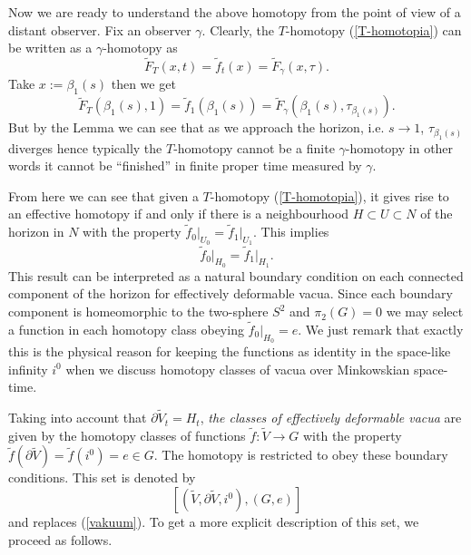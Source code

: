 \documentclass[a4paper,12pt,draft]{article}
\begin{document}
\noindent Now we are ready to understand the above homotopy from the
point of view of a distant observer. Fix an observer $\gamma$. Clearly,
the $T$-homotopy (\ref{T-homotopia}) can be written as a
$\gamma$-homotopy as
\[\widetilde{F}_T(x,t)=\tilde{f}_t(x)=\widetilde{F}_{\gamma}(x, \tau ).\]
Take $x:=\beta_1(s)$ then we get
\[\widetilde{F}_T(\beta_1(s),
1)=\tilde{f}_1(\beta_1(s))=\widetilde{F}_\gamma (\beta_1(s),
\tau_{\beta_1(s)}).\]
But by the Lemma we can see that as we approach the horizon, i.e.
$s\rightarrow 1$, $\tau_{\beta_1(s)}$ diverges hence typically the
$T$-homotopy cannot be a finite $\gamma$-homotopy in other
words it cannot be ``finished'' in finite proper time measured by
$\gamma$.

From here we can see that given a $T$-homotopy (\ref{T-homotopia}), it
gives rise to an effective homotopy if and only if there is a
neighbourhood $H\subset U\subset N$ of the horizon in $N$ with the
property $\tilde{f}_0\vert_{U_0}=\tilde{f}_1\vert_{U_1}$. This implies
\[\tilde{f}_0\vert_{H_0}=\tilde{f}_1\vert_{H_1}.\]
This result can be interpreted as a natural boundary condition on each
connected component of the horizon for effectively deformable vacua.
Since each boundary component is homeomorphic to the two-sphere $S^2$
and $\pi_2(G)=0$ we may select a function in each homotopy class
obeying $\tilde{f}_0\vert_{H_0}=e$.
We just remark that exactly this is the physical reason for keeping the
functions as identity in the space-like infinity $i^0$ when we discuss
homotopy classes of vacua over Minkowskian space-time.

Taking into account that $\partial\widetilde{V}_t=H_t$, {\it the classes 
of effectively deformable vacua} are given by the homotopy classes of
functions $\tilde{f}:\widetilde{V}\rightarrow G$ with the property
$\tilde{f}(\partial\widetilde{V})=\tilde{f}(i^0)=e\in G$. The homotopy is
restricted to obey these boundary conditions. This set is denoted by
\begin{equation}
\left[ (\widetilde{V}, \partial\widetilde{V}, i^0), (G,
e)\right]
\label{ujvakuum}
\end{equation}
and replaces (\ref{vakuum}). To get a more explicit description of
this set, we proceed as follows.
\end{document}

